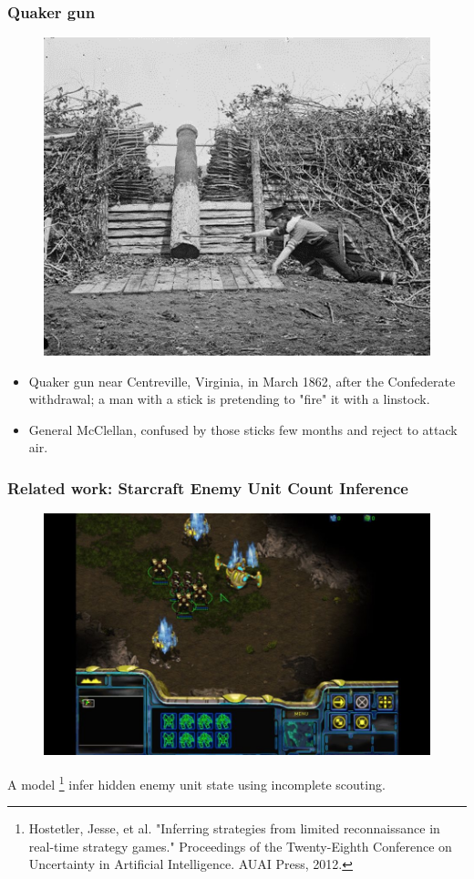 \documentclass{beamer}
\begin{document}
\begin{frame}

    \frametitle{Quaker gun}

        \begin{figure}[htb]
            \centering
            \includegraphics[width=0.4\linewidth]{quake_gun.png}
        \end{figure}    
    
        \begin{itemize}
        \item Quaker gun near Centreville, Virginia, in March 1862, after the Confederate withdrawal; a man with a stick is pretending to "fire" it with a linstock.
        \item General McClellan, confused by those sticks few months and reject to attack air.
        \end{itemize}

\end{frame}

\begin{frame}
    \frametitle{Related work: Starcraft Enemy Unit Count Inference}

    \begin{figure}[htb]
        \centering
        \includegraphics[width=0.7\linewidth]{starcraft.jpg}
    \end{figure}

    A model \footnote{Hostetler, Jesse, et al. "Inferring strategies from limited reconnaissance in real-time strategy games." Proceedings of the Twenty-Eighth Conference on Uncertainty in Artificial Intelligence. AUAI Press, 2012.
    } infer hidden enemy unit state using incomplete scouting.

\end{frame}
\end{document}
